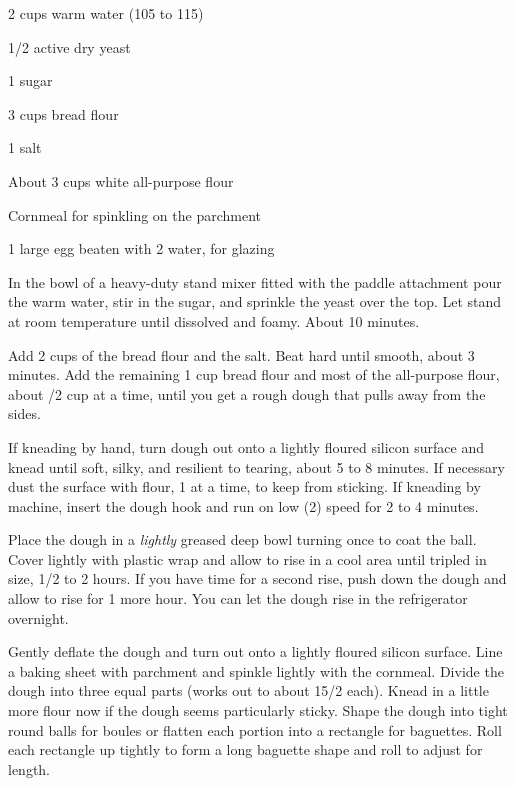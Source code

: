 \begin{IngredientsAndSteps}
    \ListIngredientsAndSteps
    {
        2 cups warm water (105 to 115\Degrees[F])

        1/2 \Tbl[s] active dry yeast

        1 \Tbl sugar

        3 cups bread flour

        1 \Tbl salt

        About 3 cups white all-purpose flour

        Cornmeal for spinkling on the parchment

        1 large egg beaten with 2 \tsp[s] water, for glazing
    }
    {
        In the bowl of a heavy-duty stand mixer fitted with the paddle
        attachment pour the warm water, stir in the sugar, and sprinkle the
        yeast over the top. Let stand at room temperature until dissolved
        and foamy. About 10 minutes.

        Add 2 cups of the bread flour and the salt. Beat hard until smooth,
        about 3 minutes. Add the remaining 1 cup bread flour and most of the
        all-purpose flour, about /2 cup at a time, until you get a
        rough dough that pulls away from the sides.

        If kneading by hand, turn dough out onto a lightly floured silicon
        surface and knead until soft, silky, and resilient to tearing, about
        5 to 8 minutes. If necessary dust the surface with flour, 1 \Tbl
        at a time, to keep from sticking. If kneading by machine, insert the
        dough hook and run on low (2) speed for 2 to 4 minutes.

        Place the dough in a \textit{lightly} greased deep bowl turning once
        to coat the ball. Cover lightly with plastic wrap and allow to rise
        in a cool area until tripled in size, 1/2 to 2 hours. If you
        have time for a second rise, push down the dough and allow to rise
        for 1 more hour. You can let the dough rise in the refrigerator overnight.

        Gently deflate the dough and turn out onto a lightly floured silicon surface.
        Line a baking sheet with parchment and spinkle lightly with the cornmeal.
        Divide the dough into three equal parts (works out to about 15/2
        \Ounce[s] each). Knead in a little more flour now if the dough seems particularly
        sticky. Shape the dough into tight round balls for boules or flatten each
        portion into a rectangle for baguettes. Roll each rectangle up tightly to
        form a long baguette shape and roll to adjust for length.
    }
\end{IngredientsAndSteps}

